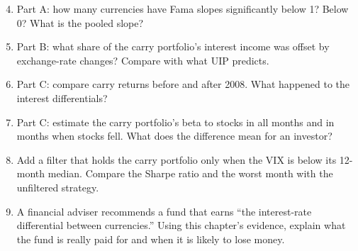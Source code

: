 \begin{enumerate}
  \setcounter{enumi}{3}
  \item Part A: how many currencies have Fama slopes significantly below 1? Below 0? What is the pooled slope?
  \item Part B: what share of the carry portfolio's interest income was offset by exchange-rate changes? Compare with what UIP predicts.
  \item Part C: compare carry returns before and after 2008. What happened to the interest differentials?
  \item Part C: estimate the carry portfolio's beta to stocks in all months and in months when stocks fell. What does the difference mean for an investor?
  \item Add a filter that holds the carry portfolio only when the VIX is below its 12-month median. Compare the Sharpe ratio and the worst month with the unfiltered strategy.
  \item A financial adviser recommends a fund that earns ``the interest-rate differential between currencies.'' Using this chapter's evidence, explain what the fund is really paid for and when it is likely to lose money.
\end{enumerate}
